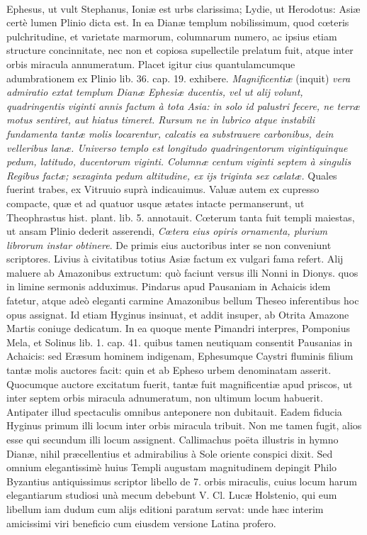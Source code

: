 \documentclass[a4paper, 11pt, oneside, polutonikogreek, latin]{article}
\begin{document}
\paragraph{}
Ephesus, ut vult Stephanus, Ioniæ est urbs clarissima; Lydie, ut Herodotus: Asiæ certè lumen Plinio dicta est. In ea Dianæ templum nobilissimum, quod cœteris pulchritudine, et varietate marmorum, columnarum numero, ac ipsius etiam structure concinnitate, nec non et copiosa supellectile prelatum fuit, atque inter orbis miracula annumeratum. Placet igitur cius quantulamcumque adumbrationem ex Plinio lib. 36. cap. 19. exhibere. \emph{Magnificentiæ} (inquit) \emph{vera admiratio extat templum Dianæ Ephesiæ ducentis, vel ut alij volunt, quadringentis viginti annis factum à tota Asia: in solo id palustri fecere, ne terræ motus sentiret, aut hiatus timeret. Rursum ne in lubrico atque instabili fundamenta tantæ molis locarentur, calcatis ea substrauere carbonibus, dein velleribus lanæ. Universo templo est longitudo quadringentorum vigintiquinque pedum, latitudo, ducentorum viginti. Columnæ centum viginti septem à singulis Regibus factæ; sexaginta pedum altitudine, ex ijs triginta sex cælatæ.} Quales fuerint trabes, ex Vitruuio suprà indicauimus. Valuæ autem ex cupresso compacte, quæ et ad quatuor usque ætates intacte permanserunt, ut Theophrastus hist. plant. lib. 5. annotauit. Cœterum tanta fuit templi maiestas, ut ansam Plinio dederit asserendi, \emph{Cœtera eius opiris ornamenta, plurium librorum instar obtinere}. De primis eius auctoribus inter se non conveniunt scriptores. Livius à civitatibus totius Asiæ factum ex vulgari fama refert. Alij maluere ab Amazonibus extructum: quò faciunt versus illi Nonni in Dionys. quos in limine sermonis adduximus. Pindarus apud Pausaniam in Achaicis idem fatetur, atque adeò eleganti carmine Amazonibus bellum Theseo inferentibus hoc opus assignat. Id etiam Hyginus insinuat, et addit insuper, ab Otrita Amazone Martis coniuge dedicatum. In ea quoque mente Pimandri interpres, Pomponius Mela, et Solinus lib. 1. cap. 41. quibus tamen neutiquam consentit Pausanias in Achaicis: sed Eræsum hominem indigenam, Ephesumque Caystri fluminis filium tantæ molis auctores facit: quin et ab Epheso urbem denominatam asserit. Quocumque auctore excitatum fuerit, tantæ fuit magnificentiæ apud priscos, ut inter septem orbis miracula adnumeratum, non ultimum locum habuerit. Antipater illud spectaculis omnibus anteponere non dubitauit. Eadem fiducia Hyginus primum illi locum inter orbis miracula tribuit. Non me tamen fugit, alios esse qui secundum illi locum assignent. Callimachus poëta illustris in hymno Dianæ, nihil præcellentius et admirabilius à Sole oriente conspici dixit. Sed omnium elegantissimè huius Templi augustam magnitudinem depingit Philo Byzantius antiquissimus scriptor libello de 7. orbis miraculis, cuius locum harum elegantiarum studiosi unà mecum debebunt V. Cl. Lucæ Holstenio, qui eum libellum iam dudum cum alijs editioni paratum servat: unde hæc interim amicissimi viri beneficio cum eiusdem versione Latina profero.
\end{document}
